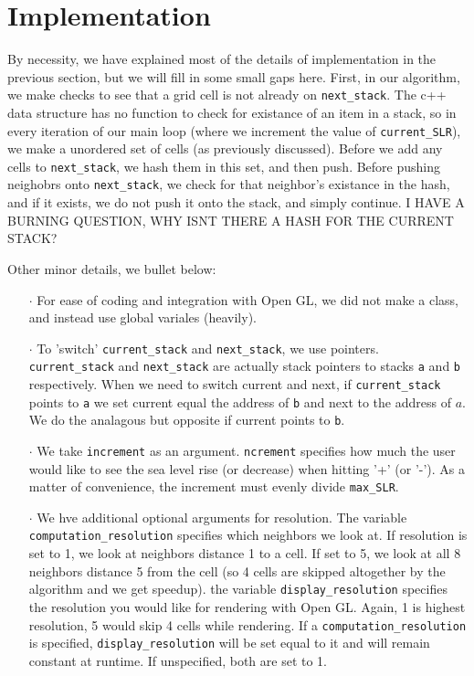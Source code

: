\documentclass[]{scrartcl}
\begin{document}
\section{Implementation}
\indent \indent By necessity, we have explained most of the details of implementation in the previous section, but we will fill in some small gaps here. First, in our algorithm, we make checks to see that a grid cell is not already on \texttt{next\_stack}. The c++ data structure has no function to check for existance of an item in a stack, so in every iteration of our main loop (where we increment the value of \texttt{current\_SLR}), we make a unordered set of cells (as previously discussed). Before we add any cells to \texttt{next\_stack}, we hash them in this set, and then push. Before pushing neighobrs onto \texttt{next\_stack}, we check for that neighbor's existance in the hash, and if it exists, we do not push it onto the stack, and simply continue. I HAVE A BURNING QUESTION, WHY ISNT THERE A HASH FOR THE CURRENT STACK? \par
\indent Other minor details, we bullet below:
\begin{enumerate}
\item[$\cdot$] For ease of coding and integration with Open GL, we did not make a class, and instead use global variales (heavily). 
\item[$\cdot$] To 'switch' \texttt{current\_stack} and \texttt{next\_stack}, we use pointers. \texttt{current\_stack} and \texttt{next\_stack} are actually stack pointers to stacks \texttt{a} and \texttt{b} respectively. When we need to switch current and next, if \texttt{current\_stack} points to \texttt{a} we set current equal the address of \texttt{b} and next to the address of $a$. We do the analagous but opposite if current points to \texttt{b}.
\item[$\cdot$] We take \texttt{increment} as an argument. \texttt{ncrement} specifies how much the user would like to see the sea level rise (or decrease) when hitting '+' (or '-'). As a matter of convenience, the increment must evenly divide \texttt{max\_SLR}.
\item[$\cdot$] We hve additional optional arguments for resolution. The variable \texttt{computation\_resolution} specifies which neighbors we look at. If resolution is set to 1, we look at neighbors distance 1 to a cell. If set to 5, we look at all 8 neighbors distance 5 from the cell (so 4 cells are skipped altogether by the algorithm and we get speedup). the variable \texttt{display\_resolution} specifies the resolution you would like for rendering with Open GL. Again, 1 is highest resolution, 5 would skip 4 cells while rendering. If a \texttt{computation\_resolution} is specified, \texttt{display\_resolution} will be set equal to it and will remain constant at runtime. If unspecified, both are set to 1.
\end{enumerate}
\end{document}
